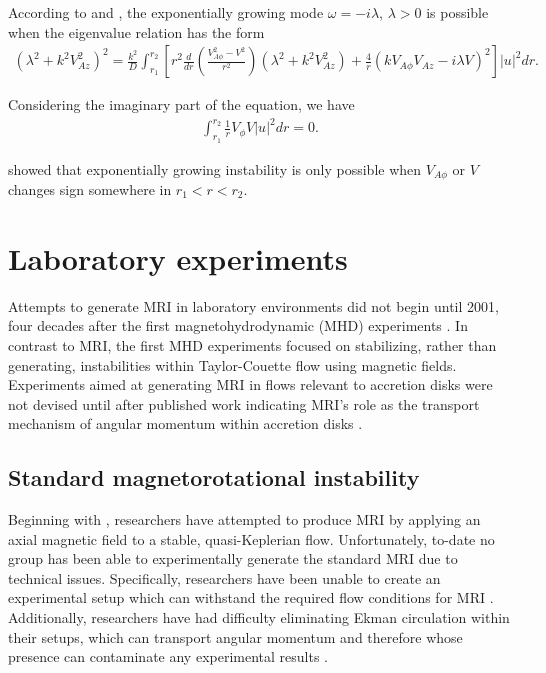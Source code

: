 \documentclass{jfm}
\begin{document}
According to \cite{Knobloch1992} and \cite{Julien2010}, the exponentially 
growing mode $\omega =-i\lambda$, $\lambda>0$ is possible when the eigenvalue 
relation has the form
\begin{align}
    (\lambda^2 +k^2 V_{Az}^2)^2 = \frac{k^2}{D}\int_{r_1}^{r_2} \left[ r^2 \frac{d}{dr}\left( \frac{V_{A\phi}^2-V^2}{r^2}\right)(\lambda^2+k^2 V_{Az}^2) + \frac{4}{r}(k V_{A\phi} V_{Az}-i\lambda V)^2 \right]|u|^2 dr.
\end{align}

Considering the imaginary part of the equation, we have 
\begin{align}
    \int_{r_1}^{r_2} \frac{1}{r}V_\phi V |u|^2 dr =0 .
\end{align}

\cite{Knobloch1992} showed that exponentially growing instability is only possible 
when $V_{A\phi}$ or $V$ changes sign somewhere in $r_1< r < r_2$.



\section{Laboratory experiments}
\label{sec:experiments}

Attempts to generate MRI in laboratory environments did not begin until 2001,
four decades after the first magnetohydrodynamic (MHD) experiments
\citep{Donnelly1960}. In contrast to MRI, the first MHD experiments focused on
stabilizing, rather than generating, instabilities within Taylor-Couette flow
using magnetic fields. Experiments aimed at generating MRI in flows relevant to
accretion disks were not devised until after published work indicating MRI's
role as the transport mechanism of angular momentum within accretion disks
\citep{Balbus1991}.

%
%
\subsection{Standard magnetorotational instability}
\label{sec:standard_mri}
Beginning with \cite{Ji2001}, researchers have attempted to produce MRI by
applying an axial magnetic field to a stable, quasi-Keplerian flow.
Unfortunately, to-date no group has been able to experimentally generate the
standard MRI due to technical issues. Specifically, researchers have been
unable to create an experimental setup which can withstand the required flow
conditions for MRI \citep{Ji2001, Ji2002}. Additionally, researchers have had
difficulty eliminating Ekman circulation within their setups, which can
transport angular momentum and therefore whose presence can contaminate any
experimental results \citep{Kageyama2004}.
\end{document}
